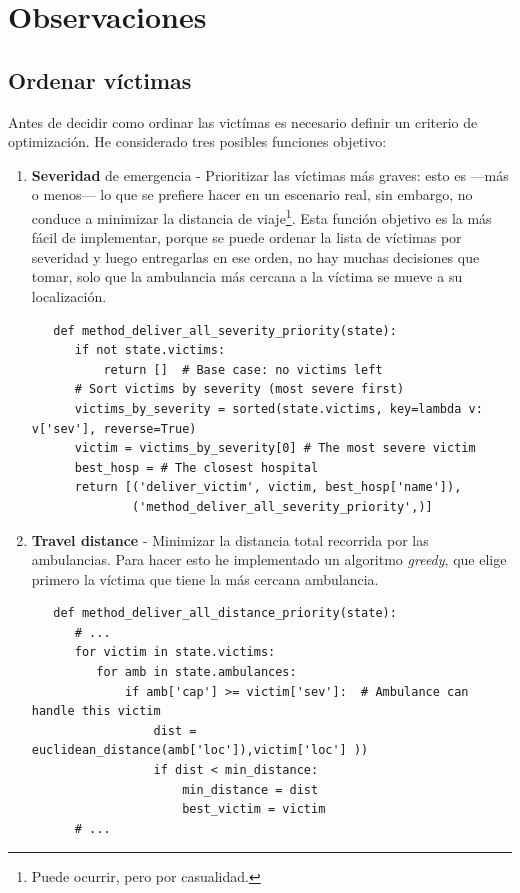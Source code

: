 \section{Observaciones}

\subsection{Ordenar víctimas}
\label{sec:ordenar_victimas}

Antes de decidir como ordinar las victímas es necesario definir un criterio de optimización. He considerado tres posibles funciones objetivo:
\begin{enumerate}
   \item \textbf{Severidad} de emergencia - Prioritizar las víctimas más graves: esto es ---más o menos--- lo que se prefiere hacer en un escenario real, sin embargo, no conduce a minimizar la distancia de viaje\footnote{Puede ocurrir, pero por casualidad.}.
   Esta función objetivo es la más fácil de implementar, porque se puede ordenar la lista de víctimas por severidad y luego entregarlas en ese orden, no hay muchas decisiones que tomar, solo que la ambulancia más cercana a la víctima se mueve a su localización.
   \begin{lstlisting}
   def method_deliver_all_severity_priority(state):
      if not state.victims:
          return []  # Base case: no victims left
      # Sort victims by severity (most severe first)
      victims_by_severity = sorted(state.victims, key=lambda v: v['sev'], reverse=True)
      victim = victims_by_severity[0] # The most severe victim
      best_hosp = # The closest hospital
      return [('deliver_victim', victim, best_hosp['name']),
              ('method_deliver_all_severity_priority',)]
   \end{lstlisting}
   \newpage
   \item \textbf{Travel distance} - Minimizar la distancia total recorrida por las ambulancias. Para hacer esto he implementado un algoritmo \textit{greedy}, que elige primero la víctima que tiene la más cercana ambulancia. 
   \begin{lstlisting}
   def method_deliver_all_distance_priority(state):
      # ...
      for victim in state.victims:
         for amb in state.ambulances:
             if amb['cap'] >= victim['sev']:  # Ambulance can handle this victim
                 dist = euclidean_distance(amb['loc']),victim['loc'] ))
                 if dist < min_distance:
                     min_distance = dist
                     best_victim = victim
      # ...
   \end{lstlisting}


\end{enumerate}
